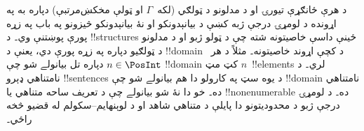 \documentclass[../../../include/open-logic-section]{subfiles}
\begin{document}
د هرې ځانګړې تيورۍ او د مدلونو د ټولګي (لکه~$\Gamma$ او ټولې
مخکښ‌مرتبې) دپاره به په اړونده د لومړۍ درجې ژبه کښې د بيانېدونکو او
نۀ بيانېدونکو څيزونو په باب په زړه پورې پوښتنې وي۔ د
!!{structure}s ځينې داسې خاصيتونه شته چې د ټولو ژبو او د مدلونو د
ټولګيو دپاره په زړه پورې دي، يعنې د !!{domain} د کچې اړوند خاصيتونه۔
مثلاً د هر~$n \in \PosInt$ دپاره تل بيانولے شو چې !!{domain} کټ مټ
$n$~!!{element}s لري۔ د نامتناهي ډېرو !!{sentence}s د يوه سټ په
کارولو دا هم بيانولے شو چې !!{domain} نامتناهي ده۔ خو دا نۀ شو
بيانولے چې د تعريف ساحه متناهي يا !!{nonenumerable} ده۔ د لومړۍ
درجې ژبو د محدوديتونو دا پايلې د متناهي شاهد او
د لوېنهايم--سکولم له قضيو څخه راځي۔
\end{document}
